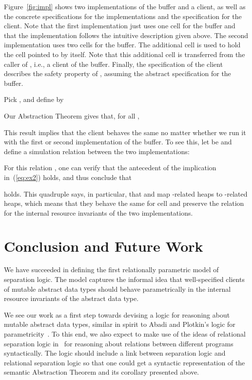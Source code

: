 \documentclass{LMCS}
\begin{document}
Figure~\ref{fig:impl} shows
two implementations of the buffer and a client,
as well as the concrete specifications for
the implementations and the specification for the client.
Note that the first implementation just uses one cell for the buffer
and that the implementation follows the intuitive description given above. 
The second implementation uses two cells for the buffer. The additional
cell is used to hold the cell pointed to by  itself. Note that this
additional cell is transferred from the caller of , i.e.,
a client of the buffer. Finally, the specification of the client
describes the safety property of , assuming the abstract specification 
for the buffer.

Pick ,
and define  by

Our Abstraction Theorem gives that, for all ,

This result implies that the client behaves the same no matter
whether we run it with the first or second implementation of the
buffer. To see this, let  be  
and define a simulation relation
 between the two implementations:

For this relation , one can verify that the antecedent 
of the implication
in~(\ref{eq:ex2}) holds, and thus conclude that 

holds. This quadruple says, in particular, 
that  and  map -related
heaps to -related heaps, 
which means
that they behave the same for cell  and preserve the  
relation for the internal resource invariants of the two
implementations.



\section{Conclusion and Future Work}\label{sec:discussion-futurework}

We have succeeded in defining the first relationally parametric model of
separation logic. The model captures the informal idea that well-specified
clients of mutable abstract data types should behave parametrically in the
internal resource invariants of the abstract data type.

We see our work as a first step towards devising a logic for reasoning
about mutable abstract data types, similar in spirit to Abadi and
Plotkin's logic for parametricity~\cite{abadi-plotkin,BirkedalL:defp-mscs}. 
To this end, we also
expect to make use of the ideas of
relational separation logic in~\cite{yang-relational-separation-logic}
for reasoning about relations between different programs syntactically.
The logic should include a link between separation logic and
relational separation logic so that one could get a syntactic
representation of the semantic Abstraction Theorem and its corollary
presented above.
\end{document}
